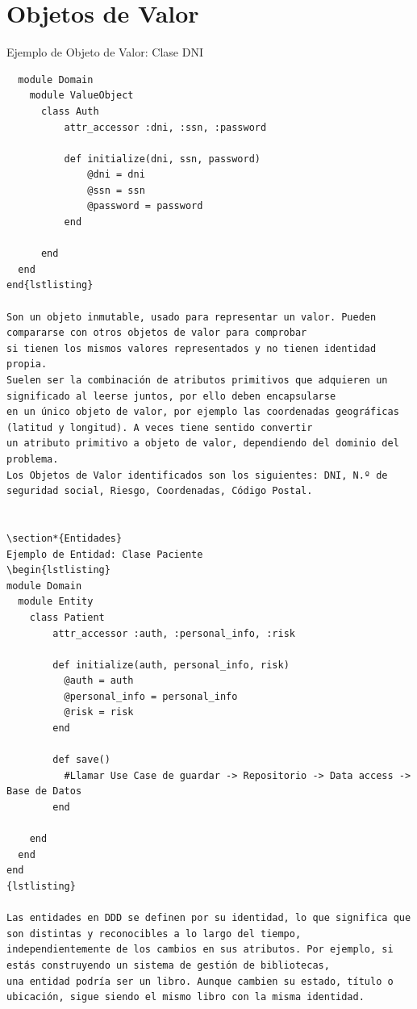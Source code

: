 \section*{Objetos de Valor}
Ejemplo de Objeto de Valor: Clase DNI
\begin{lstlisting}
  module Domain
    module ValueObject
      class Auth
          attr_accessor :dni, :ssn, :password

          def initialize(dni, ssn, password)
              @dni = dni
              @ssn = ssn
              @password = password
          end

      end
  end
end{lstlisting}

Son un objeto inmutable, usado para representar un valor. Pueden compararse con otros objetos de valor para comprobar
si tienen los mismos valores representados y no tienen identidad propia.
Suelen ser la combinación de atributos primitivos que adquieren un significado al leerse juntos, por ello deben encapsularse
en un único objeto de valor, por ejemplo las coordenadas geográficas (latitud y longitud). A veces tiene sentido convertir
un atributo primitivo a objeto de valor, dependiendo del dominio del problema.
Los Objetos de Valor identificados son los siguientes: DNI, N.º de seguridad social, Riesgo, Coordenadas, Código Postal.


\section*{Entidades}
Ejemplo de Entidad: Clase Paciente
\begin{lstlisting}
module Domain
  module Entity
    class Patient
        attr_accessor :auth, :personal_info, :risk

        def initialize(auth, personal_info, risk)
          @auth = auth
          @personal_info = personal_info
          @risk = risk
        end

        def save()
          #Llamar Use Case de guardar -> Repositorio -> Data access -> Base de Datos
        end

    end
  end
end
{lstlisting}

Las entidades en DDD se definen por su identidad, lo que significa que son distintas y reconocibles a lo largo del tiempo,
independientemente de los cambios en sus atributos. Por ejemplo, si estás construyendo un sistema de gestión de bibliotecas,
una entidad podría ser un libro. Aunque cambien su estado, título o ubicación, sigue siendo el mismo libro con la misma identidad.


\end{lstlisting}
